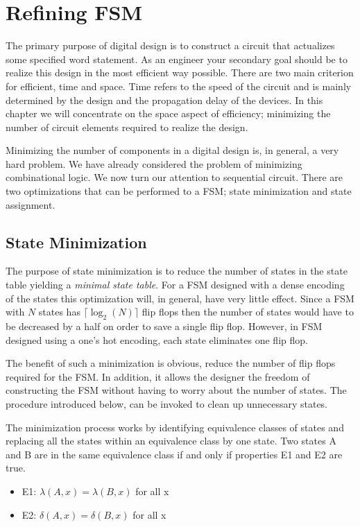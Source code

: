 \chapter{Refining FSM}
The primary purpose of digital design is to construct a circuit that
actualizes some specified word statement.  As an engineer
your secondary goal should be to realize this design in the
most efficient way possible.  There are two main criterion for
efficient, time and space.  Time refers to the speed of the
circuit and is mainly determined by the design
and the propagation delay of the devices.  In
this chapter we will concentrate on the space aspect of 
efficiency; minimizing the number of circuit elements required
to realize the design.

Minimizing the number of components in a digital design is,
in general, a very hard problem.  We have already considered
the problem of minimizing combinational logic.  We now turn 
our attention to sequential circuit.  There are two optimizations 
that can be performed to a FSM; state minimization and state 
assignment.

\section{State Minimization}
The purpose of state minimization is to reduce the number
of states in the state table yielding a {\it minimal state
table}.  For a FSM designed with a dense 
encoding of the states this optimization will, in general, have 
very little effect. Since a FSM with $N$ states has 
$\lceil \log_2(N) \rceil$ flip flops then the number of states
would have to be decreased by a half on order to save a single
flip flop.  However, in FSM designed using a one's hot encoding,
each state eliminates one flip flop.

The benefit of such a minimization is obvious, reduce the 
number of flip flops required for the FSM.  In addition, it allows
the designer the freedom of constructing the FSM without
having to worry about the number of states.  The procedure
introduced below, can be invoked to clean up unnecessary states.

The minimization process works by identifying equivalence
classes of states and replacing all the states within
an equivalence class by one state.  Two states A and B are
in the same equivalence class if and only if properties
E1 and E2 are true.
\begin{itemize}
\item E1: $\lambda (A,x) = \lambda (B,x)$ for all x
\item E2: $\delta(A,x) = \delta(B,x)$ for all x
\end{itemize}

